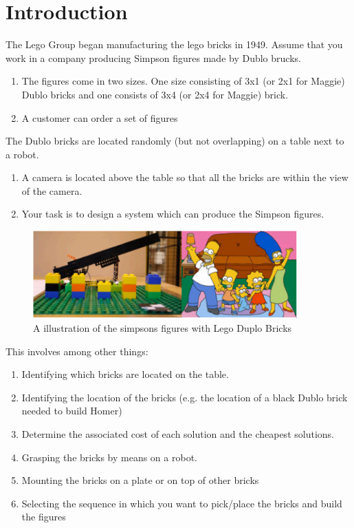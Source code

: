 \chapter{Introduction}\label{ch:introduction}
The Lego Group began manufacturing the lego bricks in 1949. 
Assume that you work in a company producing Simpson figures made by Dublo brucks.
\begin{enumerate}
\item The figures come in two sizes. One size consisting of 3x1 (or 2x1 for Maggie) Dublo bricks and one consists of 3x4 (or 2x4 for Maggie) brick.
\item A customer can order a set of figures
\end{enumerate}

The Dublo bricks are located randomly (but not
overlapping) on a table next to a robot.
\begin{enumerate}
\item A camera is located above the table so that all the
bricks are within the view of the camera.
\item Your task is to design a system which can produce
the Simpson figures. 
\end{enumerate}

\begin{figure}[hb]
  \centering
  \includegraphics[width=4in]{figures/simpsonLegoBricks.png}
  \caption[Simpsons figures Lego Bricks]
   {A illustration of the simpsons figures with Lego Duplo Bricks}
\end{figure}

This involves among other things:
\begin{enumerate}
\item Identifying which bricks are located on the table.
\item Identifying the location of the bricks (e.g. the location of a
black Dublo brick needed to build Homer)
\item Determine the associated cost of each solution and the
cheapest solutions.
\item Grasping the bricks by means on a robot.
\item Mounting the bricks on a plate or on top of other bricks
\item Selecting the sequence in which you want to pick/place
the bricks and build the figures
\end{enumerate}


